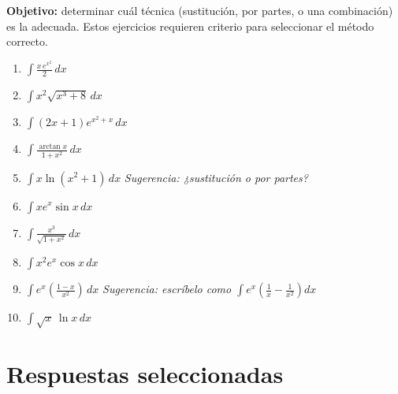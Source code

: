 \documentclass[12pt, letterpaper]{article}
\newcommand{\dx}{\,dx}
\begin{document}
\begin{cuadroinfo}
\small\textbf{Objetivo:} determinar cuál técnica (sustitución, por partes, o una
combinación) es la adecuada. Estos ejercicios requieren criterio para
seleccionar el método correcto.
\end{cuadroinfo}

\vspace{4pt}

\begin{enumerate}[label=\textbf{\arabic*.}, leftmargin=*, itemsep=14pt, start=101]

  \item \medio\quad
    $\displaystyle\int \frac{x\,e^{x^2}}{2}\dx$

  \item \medio\quad
    $\displaystyle\int x^2\sqrt{x^3+8}\dx$

  \item \medio\quad
    $\displaystyle\int (2x+1)e^{x^2+x}\dx$

  \item \medio\quad
    $\displaystyle\int \frac{\arctan x}{1+x^2}\dx$

  \item \dificil\quad
    $\displaystyle\int x\ln(x^2+1)\dx$
    \qquad\textit{Sugerencia: ¿sustitución o por partes?}

  \item \dificil\quad
    $\displaystyle\int xe^x\sin x\dx$

  \item \dificil\quad
    $\displaystyle\int \frac{x^3}{\sqrt{1+x^2}}\dx$

  \item \dificil\quad
    $\displaystyle\int x^2 e^x \cos x\dx$

  \item \dificil\quad
    $\displaystyle\int e^x\left(\frac{1-x}{x^2}\right)\dx$
    \qquad\textit{Sugerencia: escríbelo como $\int e^x\!\left(\frac{1}{x}-\frac{1}{x^2}\right)\!dx$}

  \item \dificil\quad
    $\displaystyle\int \sqrt{x}\,\ln x\dx$

\end{enumerate}

\vspace{8pt}

\ifmwclaves
\section*{Respuestas seleccionadas}
\end{document}
